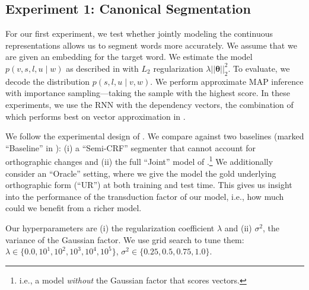 \documentclass[11pt,letterpaper]{article}
\renewcommand{\vec}{\boldsymbol}
\newcommand{\vtheta}{{\vec{\theta}}}
\begin{document}
\subsection{Experiment 1: Canonical Segmentation}
For our first experiment, we test whether jointly modeling the continuous
representations allows us to segment words more accurately. We
assume that we are given an embedding for the target word. We estimate
the model $p(v, s, l, u \mid w)$ as described in 
with $L_2$ regularization $\lambda||\vtheta||_2^2$. To evaluate, we decode the distribution $p(s, l, u \mid v, w)$.
We perform approximate MAP inference with importance sampling---taking
the sample with the highest score. In these experiments, we use the
RNN with the dependency vectors, the combination of which performs best
on vector approximation in .

We follow the experimental design of . We
compare against two baselines (marked ``Baseline'' in ): (i) a ``Semi-CRF'' segmenter that cannot
account for  orthographic changes and (ii) the full ``Joint'' model of
.\footnote{i.e., a model
{\em without} the Gaussian factor that scores vectors.} We
additionally consider an ``Oracle'' setting, where we give the model
the gold underlying orthographic form (``UR'') at both training and test time.
This gives us insight into the performance of the transduction factor
of our model, i.e., how much could we benefit from a richer model.

%
%

Our hyperparameters are (i) the regularization coefficient
$\lambda$ and (ii) $\sigma^2$, the variance of the Gaussian
factor. We use grid search to tune them: $\lambda \in
\{0.0, 10^{1}, 10^{2}, 10^{3}, 10^{4}, 10^{5}\}$, $\sigma^2 \in
\{0.25, 0.5, 0.75, 1.0\}$.
\end{document}
